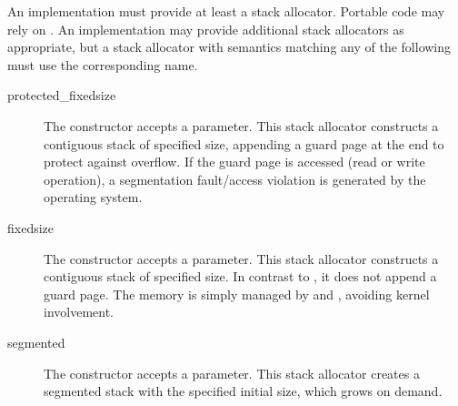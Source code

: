 An implementation must provide at least a  stack allocator.
Portable code may rely on . An implementation may provide
additional stack allocators as appropriate, but a stack allocator with
semantics matching any of the following must use the corresponding name.
\begin{description}
  \item[protected\_fixedsize] The constructor accepts a  parameter.
        This stack allocator constructs a contiguous stack of specified size,
        appending a guard page at the end to protect against overflow. If the
        guard page is accessed (read or write operation), a segmentation
        fault/access violation is generated by the operating system.
  \item[fixedsize] The constructor accepts a  parameter.
        This stack allocator constructs a contiguous stack of specified size.
        In contrast to , it does not append a guard
        page. The memory is simply managed by 
        and , avoiding kernel involvement.
  \item[segmented] The constructor accepts a  parameter.
        This stack allocator creates a segmented stack\cite{gccsplit} with the
        specified initial size, which grows on demand.
\end{description}
